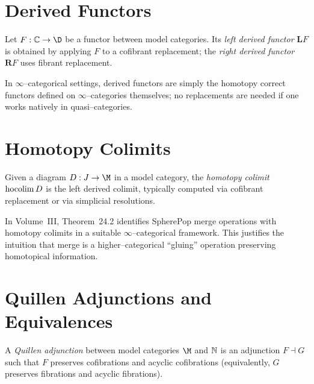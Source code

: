 \section{Derived Functors}

Let $F:\C\to\D$ be a functor between model categories.  Its \emph{left derived
functor} $\mathbf{L}F$ is obtained by applying $F$ to a cofibrant replacement;
the \emph{right derived functor} $\mathbf{R}F$ uses fibrant replacement.

\begin{remark}
In $\infty$--categorical settings, derived functors are simply the homotopy
correct functors defined on $\infty$--categories themselves; no replacements
are needed if one works natively in quasi--categories.
\end{remark}

\section{Homotopy Colimits}

\begin{definition}
Given a diagram $D:J\to\M$ in a model category, the \emph{homotopy colimit}
$\operatorname{hocolim} D$ is the left derived colimit, typically computed via cofibrant
replacement or via simplicial resolutions.
\end{definition}

\begin{remark}
In Volume~III, Theorem~24.2 identifies SpherePop merge operations with homotopy
colimits in a suitable $\infty$--categorical framework.  This justifies the
intuition that merge is a higher--categorical ``gluing'' operation preserving
homotopical information.
\end{remark}

\section{Quillen Adjunctions and Equivalences}

\begin{definition}
A \emph{Quillen adjunction} between model categories $\M$ and $\mathbb{N}$ is an
adjunction $F\dashv G$ such that $F$ preserves cofibrations and acyclic
cofibrations (equivalently, $G$ preserves fibrations and acyclic fibrations).
\end{definition}

